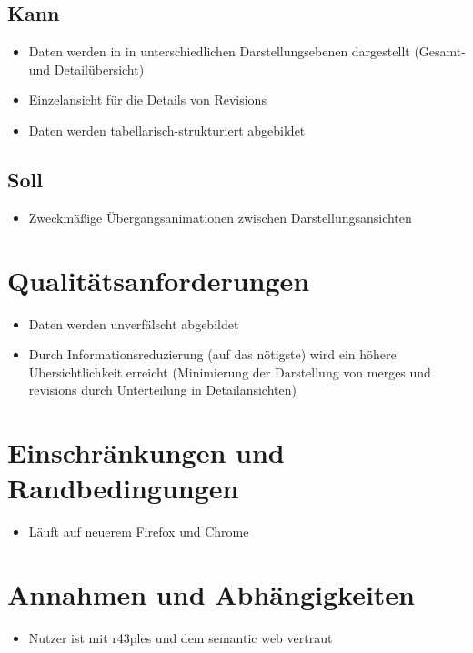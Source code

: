 \documentclass[color, ddc]{tudscrreprt}
\begin{document}
\subsection{Kann}
\begin{itemize}
\item Daten werden in in unterschiedlichen Darstellungsebenen dargestellt (Gesamt- und Detailübersicht)
\item Einzelansicht für die Details von Revisions
\item Daten werden tabellarisch-strukturiert abgebildet
\end{itemize}

\subsection{Soll}
\begin{itemize}
\item Zweckmäßige Übergangsanimationen zwischen Darstellungsansichten
\end{itemize}

\section{Qualitätsanforderungen}
\begin{itemize}
\item Daten werden unverfälscht abgebildet
\item Durch Informationsreduzierung (auf das nötigste) wird ein höhere Übersichtlichkeit erreicht (Minimierung der Darstellung von merges und revisions durch Unterteilung in Detailansichten)
\end{itemize}

\section{Einschränkungen und Randbedingungen}
\begin{itemize}
\item Läuft auf neuerem Firefox und Chrome
\end{itemize}

\section{Annahmen und Abhängigkeiten}
\begin{itemize}
\item Nutzer ist mit r43ples und dem semantic web vertraut
\end{itemize}
\end{document}
